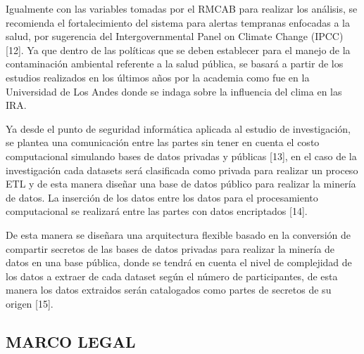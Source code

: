 \documentclass[a4paper, 11pt, oneside]{article}
\theoremstyle{definition}
\theoremstyle{remark}
\begin{document}
Igualmente con las variables tomadas por el RMCAB para realizar los análisis, se recomienda el fortalecimiento del sistema para alertas tempranas enfocadas a la salud, por sugerencia del Intergovernmental Panel on Climate Change (IPCC) [12]. Ya que dentro de las políticas que se deben establecer para el manejo de la contaminación ambiental referente a la salud pública, se basará a partir de los estudios realizados en los últimos años por la academia como fue en la Universidad de Los Andes donde se indaga sobre la influencia del clima en las IRA.

Ya desde el punto de seguridad informática aplicada al estudio de investigación, se plantea una comunicación entre las partes sin tener en cuenta el costo computacional simulando bases de datos privadas y públicas [13], en el caso de la investigación cada datasets será clasificada como privada para realizar un proceso ETL y de esta manera diseñar una base de datos público para realizar la minería de datos. La inserción de los datos entre los datos para el procesamiento computacional se realizará entre las partes con datos encriptados [14].

De esta manera se diseñara una arquitectura flexible basado en la conversión de compartir secretos de las bases de datos privadas para realizar la minería de datos en una base pública, donde se tendrá en cuenta el nivel de complejidad de los datos a extraer de cada dataset según el número de participantes, de esta manera los datos extraidos serán catalogados como partes de secretos de su origen [15].

\subsection{MARCO LEGAL}
\end{document}
